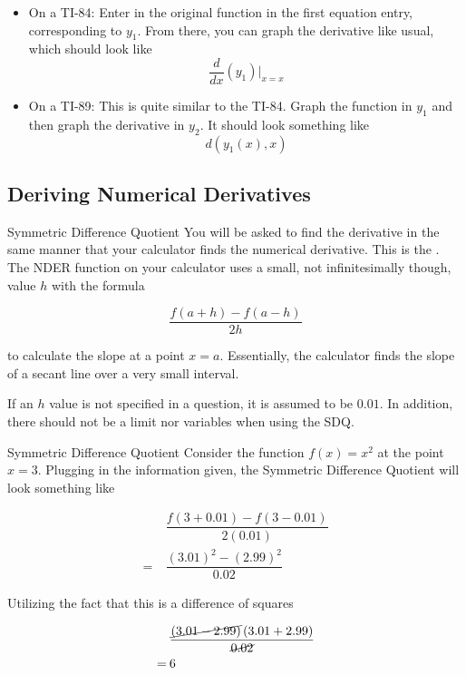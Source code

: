 \begin{itemize}
    \item On a TI-84: Enter in the original function in the first equation entry, corresponding to \( y_1 \). From there, you can graph the derivative like usual, which should look like
    \[ \dfrac{d}{dx} \left( y_1 \right) \vert_{x=x} \]
    \item On a TI-89: This is quite similar to the TI-84. Graph the function in \( y_1 \) and then graph the derivative in \( y_2 \). It should look something like
    \[ d \left( y_1 \left( x \right), x \right) \]
\end{itemize}

\subsection{Deriving Numerical Derivatives}

\begin{definition}{Symmetric Difference Quotient}
    You will be asked to find the derivative in the same manner that your calculator finds the numerical derivative. This is the . The NDER function on your calculator uses a small, not infinitesimally though, value \( h \) with the formula
    
    \[ \dfrac{f \left( a + h \right) - f \left( a - h \right)}{2h} \]
    
    to calculate the slope at a point \( x = a \). Essentially, the calculator finds the slope of a secant line over a very small interval.
\end{definition}

If an \( h \) value is not specified in a question, it is assumed to be \( 0.01 \). In addition, there should not be a limit nor variables when using the SDQ.

\begin{example}{Symmetric Difference Quotient}
    Consider the function \( f \left( x \right) = x^2 \) at the point \( x = 3 \). Plugging in the information given, the Symmetric Difference Quotient will look something like
    
    \begin{align}
        &\dfrac{f \left( 3 + 0.01 \right) - f \left( 3 - 0.01 \right)}{2 \left( 0.01 \right)} \\
        = \> &\dfrac{\left( 3.01 \right)^2 - \left( 2.99 \right)^2}{0.02}
    \end{align}
    
    Utilizing the fact that this is a difference of squares
    
    \begin{align}
        &\dfrac{\cancel{\left( 3.01 - 2.99 \right)} \left( 3.01 + 2.99 \right)}{\cancel{0.02}} \\
        = \> &6
    \end{align}
\end{example}

